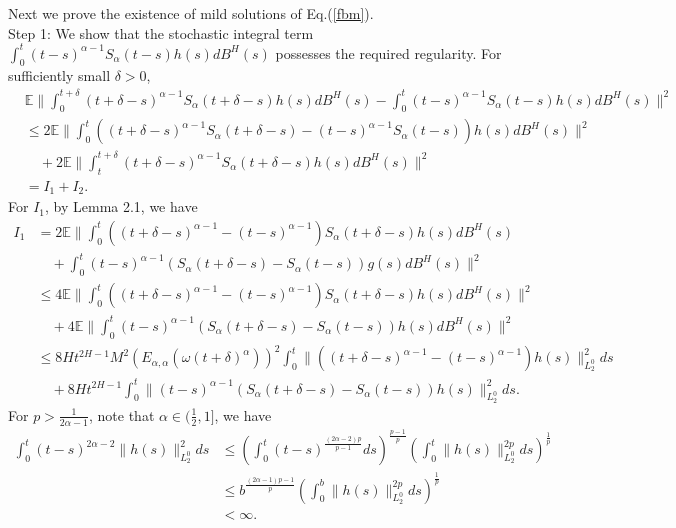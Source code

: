 \documentclass[12pt,a4paper,oneside,reqno,notitlepage]{amsart}
\theoremstyle{plain}
\numberwithin{equation}{section}
\begin{document}
Next we prove the existence of mild solutions of Eq.(\ref{fbm}).\\
Step 1: We show that the stochastic integral term $\int_{0}^{t}(t-s)^{\alpha-1}S_{\alpha}(t-s)h(s)dB^{H}(s)$ possesses the required regularity. For sufficiently small $\delta>0$,
\begin{align}\label{delta}
&\mathbb{E}\|\int_{0}^{t+\delta}(t+\delta-s)^{\alpha-1}S_{\alpha}(t+\delta-s)h(s)dB^{H}(s)-\int_{0}^{t}(t-s)^{\alpha-1}S_{\alpha}(t-s)h(s)dB^{H}(s)\|^{2}\nonumber\\
&\leq 2\mathbb{E}\|\int_{0}^{t}((t+\delta-s)^{\alpha-1}S_{\alpha}(t+\delta-s)-(t-s)^{\alpha-1}S_{\alpha}(t-s))h(s)dB^{H}(s)\|^{2}\nonumber\\
&\quad+2\mathbb{E}\|\int_{t}^{t+\delta}(t+\delta-s)^{\alpha-1}S_{\alpha}(t+\delta-s)h(s)dB^{H}(s)\|^{2}\nonumber\\
&=I_{1}+I_{2}.
\end{align}
For $I_{1}$, by Lemma 2.1, we have
\begin{align}\label{I1}
I_{1}&=2\mathbb{E}\|\int_{0}^{t}((t+\delta-s)^{\alpha-1}-(t-s)^{\alpha-1})S_{\alpha}(t+\delta-s)h(s)dB^{H}(s)\nonumber\\
&\quad+\int_{0}^{t}(t-s)^{\alpha-1}(S_{\alpha}(t+\delta-s)-S_{\alpha}(t-s))g(s)dB^{H}(s)\|^{2}\nonumber\\
&\leq 4\mathbb{E}\|\int_{0}^{t}((t+\delta-s)^{\alpha-1}-(t-s)^{\alpha-1})S_{\alpha}(t+\delta-s)h(s)dB^{H}(s)\|^{2}\nonumber\\
&\quad+4\mathbb{E}\|\int_{0}^{t}(t-s)^{\alpha-1}(S_{\alpha}(t+\delta-s)-S_{\alpha}(t-s))h(s)dB^{H}(s)\|^{2}\nonumber\\
&\leq8Ht^{2H-1}M^{2}(E_{\alpha,\alpha}(\omega (t+\delta)^{\alpha}))^{2}\int_{0}^{t}\|((t+\delta-s)^{\alpha-1}-(t-s)^{\alpha-1})h(s)\|^{2}_{L_{2}^{0}}ds\nonumber\\
&\quad+8Ht^{2H-1}\int_{0}^{t}\|(t-s)^{\alpha-1}(S_{\alpha}(t+\delta-s)-S_{\alpha}(t-s))h(s)\|^{2}_{L_{2}^{0}}ds.
\end{align}
For $p>\frac{1}{2\alpha-1}$, note that $\alpha\in (\frac{1}{2},1]$, we have
\begin{align}\label{h}
\int_{0}^{t}(t-s)^{2\alpha-2}\|h(s)\|^{2}_{L_{2}^{0}}ds&\leq \left(\int_{0}^{t}(t-s)^{\frac{(2\alpha-2)p}{p-1}}ds\right)^{\frac{p-1}{p}}\left(\int_{0}^{t}\|h(s)\|_{L_{2}^{0}}^{2p}ds\right)^{\frac{1}{p}}\nonumber\\
&\leq b^{\frac{(2\alpha-1)p-1}{p}}\left(\int_{0}^{b}\|h(s)\|_{L_{2}^{0}}^{2p}ds\right)^{\frac{1}{p}}\nonumber\\
&<\infty.
\end{align}
\end{document}
